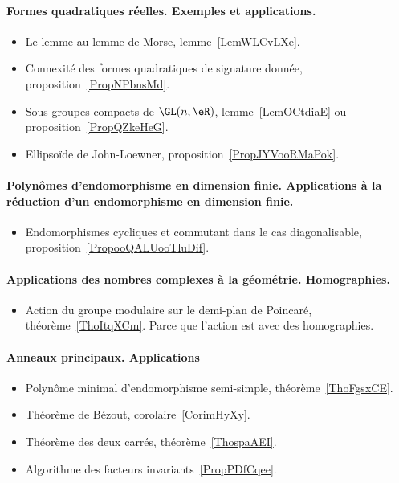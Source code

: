 \paragraph{Formes quadratiques réelles. Exemples et applications.}
\begin{itemize}
    \item Le lemme au lemme de Morse, lemme~\ref{LemWLCvLXe}.
    \item Connexité des formes quadratiques de signature donnée, proposition~\ref{PropNPbnsMd}.
    \item Sous-groupes compacts de \( \GL(n,\eR)\), lemme~\ref{LemOCtdiaE} ou proposition~\ref{PropQZkeHeG}.
    \item Ellipsoïde de John-Loewner, proposition~\ref{PropJYVooRMaPok}.
\end{itemize}
\paragraph{Polynômes d'endomorphisme en dimension finie. Applications à la réduction d'un endomorphisme en dimension finie.}
\begin{itemize}
    \item Endomorphismes cycliques et commutant dans le cas diagonalisable, proposition~\ref{PropooQALUooTluDif}.
\end{itemize}
\paragraph{Applications des nombres complexes à la géométrie. Homographies.}
\begin{itemize}
    \item Action du groupe modulaire sur le demi-plan de Poincaré, théorème~\ref{ThoItqXCm}. Parce que l'action est avec des homographies.
\end{itemize}

\paragraph{Anneaux principaux. Applications}
\begin{itemize}
    \item Polynôme minimal d'endomorphisme semi-simple, théorème~\ref{ThoFgsxCE}.
    \item Théorème de Bézout, corolaire~\ref{CorimHyXy}.
    \item Théorème des deux carrés, théorème~\ref{ThospaAEI}.
    \item Algorithme des facteurs invariants~\ref{PropPDfCqee}.
\end{itemize}

